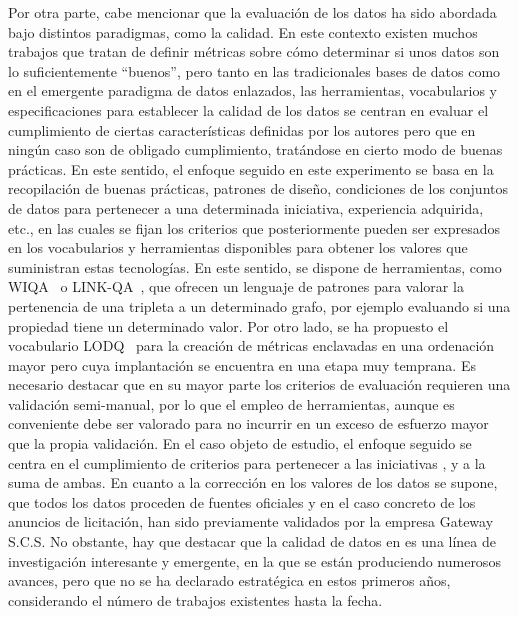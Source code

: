 Por otra parte, cabe mencionar que la evaluación de los datos ha sido abordada bajo distintos paradigmas, 
como la calidad. En este contexto existen muchos trabajos que tratan de definir métricas sobre cómo determinar
si unos datos son lo suficientemente ``buenos'', pero tanto en las tradicionales bases de datos como en el emergente 
paradigma de datos enlazados, las herramientas, vocabularios y especificaciones para establecer la calidad de los datos 
se centran en evaluar el cumplimiento de ciertas características definidas por los autores pero que en ningún caso 
son de obligado cumplimiento, tratándose en cierto modo de buenas prácticas. En este sentido, el enfoque seguido en este experimento 
se basa en la recopilación de buenas prácticas, patrones de diseño, condiciones de los conjuntos de datos para pertenecer 
a una determinada iniciativa, experiencia adquirida, etc., en las cuales se fijan los criterios que posteriormente pueden 
ser expresados en los vocabularios y herramientas disponibles para obtener los valores que suministran estas tecnologías. En este sentido, 
se dispone de herramientas, como \gls{WIQA}~\cite{bizer2007,citeulike:3875270} o LINK-QA~\cite{link-qa}, que ofrecen un lenguaje de patrones para valorar la pertenencia de una tripleta 
a un determinado grafo, por ejemplo evaluando si una propiedad tiene un determinado valor. Por otro lado, se ha propuesto el vocabulario 
\gls{LODQ}~\cite{lodq} para la creación de métricas enclavadas en una ordenación mayor pero cuya implantación se encuentra en una etapa muy temprana. Es necesario 
destacar que en su mayor parte los criterios de evaluación requieren una validación semi-manual, por lo que el empleo de herramientas, 
aunque es conveniente debe ser valorado para no incurrir en un exceso de esfuerzo mayor que la propia validación. En el caso objeto de estudio, 
el enfoque seguido se centra en el cumplimiento de criterios para pertenecer a las iniciativas \linkeddata, \opendata y a la suma 
de ambas. En cuanto a la corrección en los valores de los datos se supone, que todos los datos 
proceden de fuentes oficiales y en el caso concreto de los anuncios de licitación, han sido previamente validados 
por la empresa Gateway S.C.S. No obstante, hay que destacar que la calidad de datos en \linkeddata es una línea 
de investigación interesante y emergente, en la que se están produciendo numerosos avances, pero que no se ha declarado estratégica en estos primeros años, 
considerando el número de trabajos existentes hasta la fecha.

